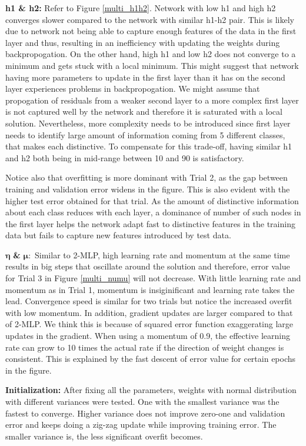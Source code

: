 \documentclass[10pt]{article}
\begin{document}
\textbf{h1 \& h2:} Refer to Figure \ref{multi_h1h2}. Network with low h1 and high h2 converges slower compared to the network with similar h1-h2 pair. This is likely due to network not being able to capture enough features of the data in the first layer and thus, resulting in an inefficiency with updating the weights during backpropogation. On the other hand, high h1 and low h2 does not converge to a minimum and gets stuck with a local minimum. This might suggest that network having more parameters to update in the first layer than it has on the second layer experiences problems in backpropogation. We might assume that propogation of residuals from a weaker second layer to a more complex first layer is not captured well by the network and therefore it is saturated with a local solution. Nevertheless, more complexity needs to be introduced since first layer needs to identify large amount of information coming from 5 different classes, that makes each distinctive. To compensate for this trade-off, having similar h1 and h2 both being in mid-range between 10 and 90 is satisfactory.

Notice also that overfitting is more dominant with Trial 2, as the gap between training and validation error widens in the figure. This is also evident with the higher test error obtained for that trial. As the amount of distinctive information about each class reduces with each layer, a dominance of number of such nodes in the first layer helps the network adapt fast to distinctive features in the training data but fails to capture new features introduced by test data.

$\boldsymbol{\eta}$ \textbf{\&} $\boldsymbol{\mu:}$ Similar to 2-MLP, high learning rate and momentum at the same time results in big steps that oscillate around the solution and therefore, error value for Trial 3 in Figure \ref{multi_numu} will not decrease. With little learning rate and momentum as in Trial 1, momentum is insiginificant and learning rate takes the lead. Convergence speed is similar for two trials but notice the increased overfit with low momentum. In addition, gradient updates are larger compared to that of 2-MLP. We think this is because of squared error function exaggerating large updates in the gradient. When using a momentum of 0.9, the effective learning rate can grow to 10 times the actual rate if the direction of weight changes is consistent. This is explained by the fast descent of error value for certain epochs in the figure.  

\textbf{Initialization:} After fixing all the parameters, weights with normal distribution with different variances were tested. One with the smallest variance was the fastest to converge. Higher variance does not improve zero-one and validation error and keeps doing a zig-zag update while improving training error. The smaller variance is, the less significant overfit becomes.
\end{document}
